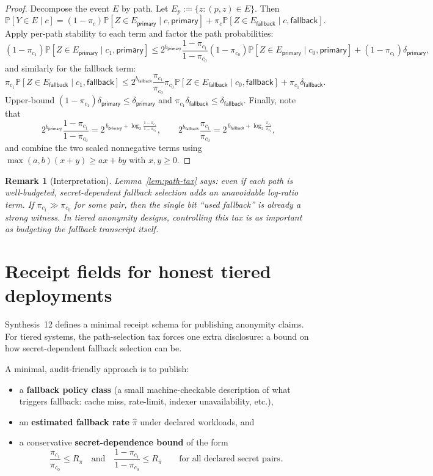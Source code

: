 \documentclass[11pt]{article}
\newtheorem{remark}{Remark}
\newcommand{\Pp}{\mathbb{P}}
\newcommand{\logtwo}{\log_2}
\begin{document}
\begin{proof}
Decompose the event $E$ by path.
Let $E_p:=\{z:(p,z)\in E\}$.
Then
\[
\Pp[Y\in E\mid c]
=(1-\pi_c)\Pp[Z\in E_{\textsf{primary}}\mid c,\textsf{primary}]
+\pi_c\Pp[Z\in E_{\textsf{fallback}}\mid c,\textsf{fallback}].
\]
Apply per-path stability to each term and factor the path probabilities:
\[
(1-\pi_{c_1})\Pp[Z\in E_{\textsf{primary}}\mid c_1,\textsf{primary}]
\le
2^{b_{\textsf{primary}}}\frac{1-\pi_{c_1}}{1-\pi_{c_0}}
(1-\pi_{c_0})\Pp[Z\in E_{\textsf{primary}}\mid c_0,\textsf{primary}]
+ (1-\pi_{c_1})\delta_{\textsf{primary}},
\]
and similarly for the fallback term:
\[
\pi_{c_1}\Pp[Z\in E_{\textsf{fallback}}\mid c_1,\textsf{fallback}]
\le
2^{b_{\textsf{fallback}}}\frac{\pi_{c_1}}{\pi_{c_0}}
\pi_{c_0}\Pp[Z\in E_{\textsf{fallback}}\mid c_0,\textsf{fallback}]
+ \pi_{c_1}\delta_{\textsf{fallback}}.
\]
Upper-bound $(1-\pi_{c_1})\delta_{\textsf{primary}}\le\delta_{\textsf{primary}}$ and $\pi_{c_1}\delta_{\textsf{fallback}}\le\delta_{\textsf{fallback}}$.
Finally, note that
\[
2^{b_{\textsf{primary}}}\frac{1-\pi_{c_1}}{1-\pi_{c_0}} = 2^{\,b_{\textsf{primary}}+\logtwo\!\frac{1-\pi_{c_1}}{1-\pi_{c_0}}},
\qquad
2^{b_{\textsf{fallback}}}\frac{\pi_{c_1}}{\pi_{c_0}} = 2^{\,b_{\textsf{fallback}}+\logtwo\!\frac{\pi_{c_1}}{\pi_{c_0}}},
\]
and combine the two scaled nonnegative terms using $\max(a,b)(x+y)\ge ax+by$ with $x,y\ge 0$.
\end{proof}

\begin{remark}[Interpretation]
Lemma~\ref{lem:path-tax} says: even if each path is well-budgeted, \emph{secret-dependent} fallback selection adds an unavoidable log-ratio term.
If $\pi_{c_1}\gg \pi_{c_0}$ for some pair, then the single bit ``used fallback'' is already a strong witness.
In tiered anonymity designs, controlling this tax is as important as budgeting the fallback transcript itself.
\end{remark}

\section{Receipt fields for honest tiered deployments}

Synthesis~12 defines a minimal receipt schema for publishing anonymity claims.
For tiered systems, the path-selection tax forces one extra disclosure: a bound on how secret-dependent fallback selection can be.

A minimal, audit-friendly approach is to publish:
\begin{itemize}[leftmargin=*]
\item a \textbf{fallback policy class} (a small machine-checkable description of what triggers fallback: cache miss, rate-limit, indexer unavailability, etc.),
\item an \textbf{estimated fallback rate} $\widehat \pi$ under declared workloads, and
\item a conservative \textbf{secret-dependence bound} of the form
\[
\frac{\pi_{c_1}}{\pi_{c_0}}\le R_{\pi}
\quad\text{and}\quad
\frac{1-\pi_{c_1}}{1-\pi_{c_0}}\le R_{\bar\pi}
\qquad\text{for all declared secret pairs.}
\]
\end{itemize}
\end{document}
